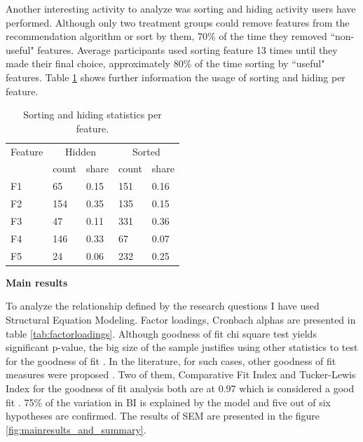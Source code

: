 \documentclass[a4paper,12pt]{article}
\begin{document}
Another interesting activity to analyze was sorting and hiding activity users have performed. Although only two treatment groups could remove features from the recommendation algorithm or sort by them, 70\% of the time they removed ``non-useful" features. Average participants used sorting feature 13 times until they made their final choice, approximately 80\% of the time sorting by ``useful" features. Table  \ref{tab:eventsperfeature} shows further information the usage of sorting and hiding per feature.

\begin{table}[!ht]
    \centering
    \begin{tabular}{lllll}
    \toprule
        Feature & \multicolumn{2}{c}{Hidden} & \multicolumn{2}{c}{Sorted} \\ \cmidrule(lr){2-3} \cmidrule(lr){4-5}
        & count & share & count & share \\ \midrule
        F1 & 65 & 0.15 & 151 & 0.16 \\
        F2 & 154 & 0.35 & 135 & 0.15 \\
        F3 & 47 & 0.11 & 331 & 0.36 \\
        F4 & 146 & 0.33 & 67 & 0.07 \\
        F5 & 24 & 0.06 & 232 & 0.25 \\ \bottomrule
    \end{tabular}
    \caption{Sorting and hiding statistics per feature.}
    \label{tab:eventsperfeature}
\end{table}

\textbf{Main results}

To analyze the relationship defined by the research questions I have used Structural Equation Modeling. Factor loadings, Cronbach alphas are presented in table \ref{tab:factorloadings}. Although goodness of fit chi square test yields significant p-value, the big size of the sample justifies using other statistics to test for the goodness of fit \citep{schermelleh2003evaluating}. In the literature, for such cases, other goodness of fit measures were proposed \citep{schreiber2006reporting}. Two of them, Comparative Fit Index and Tucker-Lewis Index for the goodness of fit analysis both are at 0.97 which is considered a good fit \citep{schumacker2004beginner}. 75\% of the variation in BI is explained by the model and five out of six hypotheses are confirmed. The results of SEM are presented in the figure \ref{fig:mainresults_and_summary}. 
\end{document}
